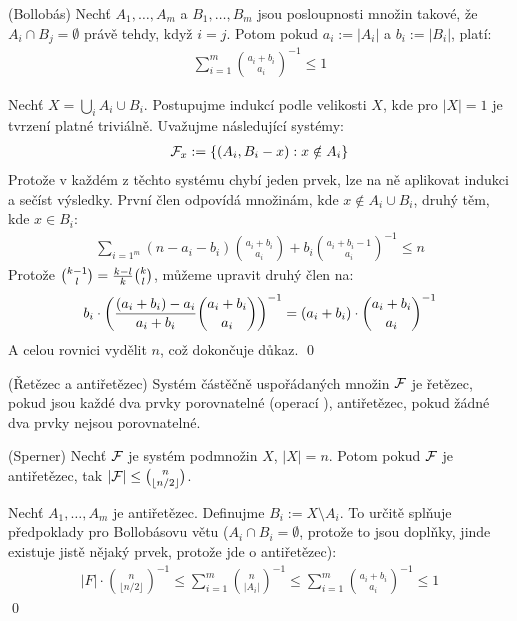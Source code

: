 \vt (Bollobás) Nechť $A_1, \dots, A_m$ a $B_1, \dots, B_m$ jsou posloupnosti 
množin takové, že $A_i \cap B_j = \emptyset$ právě tehdy, když $i = j$. Potom 
pokud $a_i := |A_i|$ a $b_i := |B_i|$, platí:
\begin{align}
	\sum_{i=1}^m\binom{a_i + b_i}{a_i}^{-1} \leq 1
\end{align}

\dk Nechť $X = \bigcup_i A_i \cup B_i$. Postupujme indukcí podle velikosti $X$, 
kde pro $|X| = 1$ je tvrzení platné triviálně. Uvažujme následující systémy:
\begin{align}
	\mathcal{F}_x := \{ (A_i, B_i - x) : x \notin A_i\}
\end{align}
Protože v každém z těchto systému chybí jeden prvek, lze na ně aplikovat indukci 
a sečíst výsledky. První člen odpovídá množinám, kde $x\notin A_i \cup B_i$, 
druhý těm, kde $x \in B_i$:
\begin{align}
	\sum_{i=1^m}(n-a_i-b_i) \binom{a_i+b_i}{a_i} + b_i\binom{a_i+b_i-1}{a_i}^{-1} \leq 
	n
\end{align}
Protože $\binom{k-1}{l} = {k-l\over k}\binom{k}{l}$, můžeme upravit druhý člen 
na:
\begin{align}
	b_i \cdot \left({(a_i+b_i)-a_i \over a_i+b_i} 
	\binom{a_i+b_i}{a_i}\right)^{-1} = (a_i + b_i) \cdot 
	\binom{a_i+b_i}{a_i}^{-1}
\end{align}
A celou rovnici vydělit $n$, což dokončuje důkaz. \qed

\df (Řetězec a antiřetězec) Systém částěčně uspořádaných množin $\mathcal{F}$ je řetězec,
pokud jsou každé dva prvky porovnatelné (operací ), antiřetězec, 
pokud žádné dva prvky nejsou porovnatelné.

\vt (Sperner) Nechť $\mathcal{F}$ je systém podmnožin $X$, $|X| = n$. Potom pokud $\mathcal{F}$ je
antiřetězec, tak $|\mathcal{F}| \leq \binom{n}{\lfloor n/2 \rfloor}$.

\dk Nechť $A_1, \dots, A_m$ je antiřetězec. Definujme $B_i := X \setminus A_i$.  
To určitě splňuje předpoklady pro Bollobásovu větu ($A_i \cap B_i = \emptyset$, 
protože to jsou doplňky, jinde existuje jistě nějaký prvek, protože jde o 
antiřetězec):
\begin{align}
	|F| \cdot \binom{n}{\lfloor n/2 \rfloor}^{-1} \leq 
	\sum_{i=1}^m\binom{n}{|A_i|}^{-1} \leq \sum_{i=1}^m \binom{a_i + 
	b_i}{a_i}^{-1} \leq 1
\end{align}
\qed
